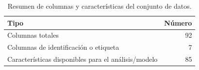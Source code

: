 \begin{table}
\caption{Resumen de columnas y características del conjunto de datos.}
\label{tab:resumen_caracteristicas}
\begin{tabular}{lr}
\toprule
Tipo & Número \\
\midrule
Columnas totales & 92 \\
Columnas de identificación o etiqueta & 7 \\
Características disponibles para el análisis/modelo & 85 \\
\bottomrule
\end{tabular}
\end{table}
